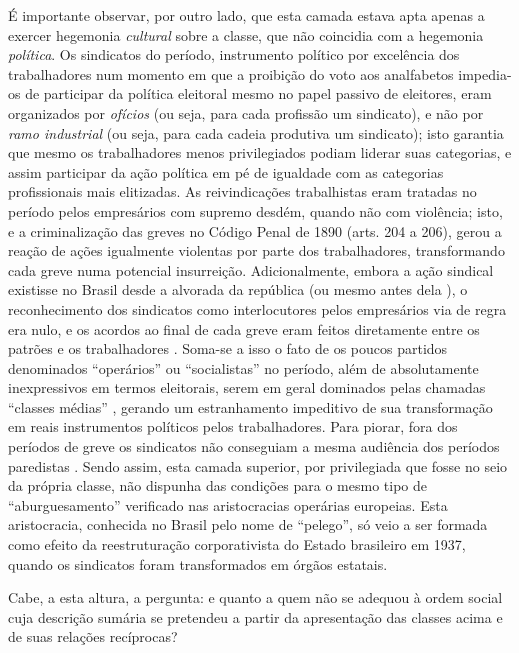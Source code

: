 É importante observar, por outro lado, que esta camada estava apta apenas a exercer hegemonia \textit{cultural} sobre a classe, que não coincidia com a hegemonia \textit{política}. Os sindicatos do período, instrumento político por excelência dos trabalhadores num momento em que a proibição do voto aos analfabetos impedia-os de participar da política eleitoral mesmo no papel passivo de eleitores, eram organizados por \textit{ofícios} (ou seja, para cada profissão um sindicato), e não por \textit{ramo industrial} (ou seja, para cada cadeia produtiva um sindicato); isto garantia que mesmo os trabalhadores menos privilegiados podiam liderar suas categorias, e assim participar da ação política em pé de igualdade com as categorias profissionais mais elitizadas. As reivindicações trabalhistas eram tratadas no período pelos empresários com supremo desdém, quando não com violência; isto, e a criminalização das greves no Código Penal de 1890 (arts. 204 a 206), gerou a reação de ações igualmente violentas por parte dos trabalhadores, transformando cada greve numa potencial insurreição. Adicionalmente, embora a ação sindical existisse no Brasil desde a alvorada da república (ou mesmo antes dela \cite[p.~69-77]{koval_prolbras_1982}), o reconhecimento dos sindicatos como interlocutores pelos empresários via de regra era nulo, e os acordos ao final de cada greve eram feitos diretamente entre os patrões e os trabalhadores \cite{dulles_anacombras_1977,koval_prolbras_1982}. Soma-se a isso o fato de os poucos partidos denominados ``operários'' ou ``socialistas'' no período, além de absolutamente inexpressivos em termos eleitorais, serem em geral dominados pelas chamadas ``classes médias'' \cite[p.~150]{pinheiro_prolind_1977}, gerando um estranhamento impeditivo de sua transformação em reais instrumentos políticos pelos trabalhadores. Para piorar, fora dos períodos de greve os sindicatos não conseguiam a mesma audiência dos períodos paredistas \cite[p.~152]{pinheiro_prolind_1977}. Sendo assim, esta camada superior, por privilegiada que fosse no seio da própria classe, não dispunha das condições para o mesmo tipo de ``aburguesamento'' verificado nas aristocracias operárias europeias. Esta aristocracia, conhecida no Brasil pelo nome de ``pelego'', só veio a ser formada como efeito da reestruturação corporativista do Estado brasileiro em 1937, quando os sindicatos foram transformados em órgãos estatais.

Cabe, a esta altura, a pergunta: e quanto a quem não se adequou à ordem social cuja descrição sumária se pretendeu a partir da apresentação das classes acima e de suas relações recíprocas? 

